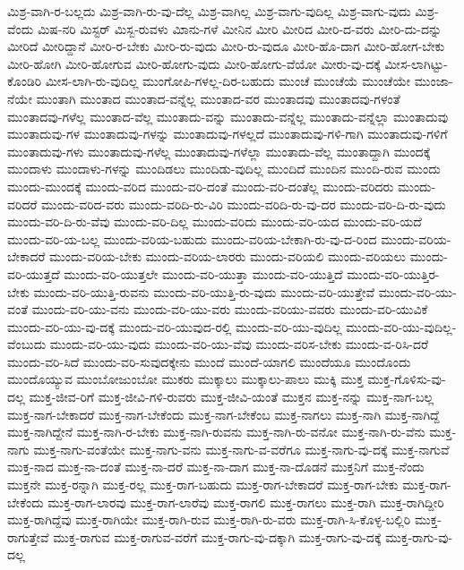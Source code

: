 {ಮಿಶ್ರ-ವಾಗಿ-ರ-ಬಲ್ಲದು
ಮಿಶ್ರ-ವಾಗಿ-ರು-ವು-ದೆಲ್ಲ
ಮಿಶ್ರ-ವಾಗಿಲ್ಲ
ಮಿಶ್ರ-ವಾಗು-ವುದಿಲ್ಲ
ಮಿಶ್ರ-ವಾಗು-ವುದು
ಮಿಶ್ರ-ವೆಂದು
ಮಿಷ-ನರಿ
ಮಿಸ್ಟರ್
ಮಿಸ್ಬ-ರುವಳು
ಮಿಾನು-ಗಳೆ
ಮೀನಿನ
ಮೀರಿ
ಮೀರಿದ
ಮೀರಿ-ದ-ವರು
ಮೀರಿ-ದು-ದನ್ನು
ಮೀರಿದೆ
ಮೀರಿದ್ದಾನೆ
ಮೀರಿ-ರ-ಬೇಕು
ಮೀರಿ-ರು-ವುದು
ಮೀರಿ-ರು-ವುದೂ
ಮೀರಿ-ಹೊ-ದಾಗ
ಮೀರಿ-ಹೋಗ-ಬೇಕು
ಮೀರಿ-ಹೋಗಿ
ಮೀರಿ-ಹೋಗುವ
ಮೀರಿ-ಹೋಗು-ವುದು
ಮೀರಿ-ಹೋಗು-ವೆಯೋ
ಮೀರು-ವು-ದಕ್ಕೆ
ಮೀಸ-ಲಾಗಿಟ್ಟು-ಕೊಂಡಿರಿ
ಮೀಸ-ಲಾಗಿ-ರು-ವುದಿಲ್ಲ
ಮುಂಗೋಪಿ-ಗಳಲ್ಲ-ದಿರ-ಬಹುದು
ಮುಂಚೆ
ಮುಂಚೆಯೆ
ಮುಂಚೆಯೇ
ಮುಂಜಾ-ನೆಯೇ
ಮುಂತಾಗಿ
ಮುಂತಾದ
ಮುಂತಾದ-ವನ್ನೆಲ್ಲ
ಮುಂತಾದ-ವರ
ಮುಂತಾದವು
ಮುಂತಾದವು-ಗಳಂತೆ
ಮುಂತಾದವು-ಗಳೆಲ್ಲ
ಮುಂತಾದ-ವೆಲ್ಲ
ಮುಂತಾದು-ವನ್ನು
ಮುಂತಾದು-ವನ್ನೆಲ್ಲ
ಮುಂತಾದು-ವನ್ನೆಲ್ಲಾ
ಮುಂತಾದುವು
ಮುಂತಾದುವು-ಗಳ
ಮುಂತಾದುವು-ಗಳನ್ನು
ಮುಂತಾದುವು-ಗಳಲ್ಲದೆ
ಮುಂತಾದುವು-ಗಳಿ-ಗಾಗಿ
ಮುಂತಾದುವು-ಗಳಿಗೆ
ಮುಂತಾದುವು-ಗಳು
ಮುಂತಾದುವು-ಗಳೆಲ್ಲ
ಮುಂತಾದುವು-ಗಳೆಲ್ಲಾ
ಮುಂತಾದು-ವೆಲ್ಲ
ಮುಂತಾದ್ದಾಗಿ
ಮುಂದಕ್ಕೆ
ಮುಂದಾಳು
ಮುಂದಾಳು-ಗಳನ್ನು
ಮುಂದಿಡಲು
ಮುಂದಿಡು-ವುದಿಲ್ಲ
ಮುಂದಿದೆ
ಮುಂದಿನ
ಮುಂದಿ-ರುವ
ಮುಂದು
ಮುಂದು-ಮುಂದಕ್ಕೆ
ಮುಂದು-ವರಿದ
ಮುಂದು-ವರಿ-ದಂತೆ
ಮುಂದು-ವರಿ-ದಂತೆಲ್ಲ
ಮುಂದು-ವರಿದರು
ಮುಂದು-ವರಿದರೆ
ಮುಂದು-ವರಿದ-ವರು
ಮುಂದು-ವರಿದಿ-ರು-ವಿರಿ
ಮುಂದು-ವರಿದಿ-ರು-ವು-ದರ
ಮುಂದು-ವರಿ-ದಿ-ರು-ವುದು
ಮುಂದು-ವರಿ-ದಿ-ರು-ವೆವು
ಮುಂದು-ವರಿ-ದಿಲ್ಲ
ಮುಂದು-ವರಿದು
ಮುಂದು-ವರಿ-ಯದ
ಮುಂದು-ವರಿ-ಯದೆ
ಮುಂದು-ವರಿ-ಯ-ಬಲ್ಲ
ಮುಂದು-ವರಿಯ-ಬಹುದು
ಮುಂದು-ವರಿಯ-ಬೇಕಾಗಿ-ರು-ವು-ದ-ರಿಂದ
ಮುಂದು-ವರಿಯ-ಬೇಕಾದರೆ
ಮುಂದು-ವರಿಯ-ಬೇಕು
ಮುಂದು-ವರಿಯ-ಲಾರರು
ಮುಂದು-ವರಿಯಲಿ
ಮುಂದು-ವರಿಯಲು
ಮುಂದು-ವರಿ-ಯುತ್ತದೆ
ಮುಂದು-ವರಿ-ಯುತ್ತಲೇ
ಮುಂದು-ವರಿ-ಯುತ್ತಾ
ಮುಂದು-ವರಿ-ಯುತ್ತಿದೆ
ಮುಂದು-ವರಿ-ಯುತ್ತಿರ-ಬೇಕು
ಮುಂದು-ವರಿ-ಯುತ್ತಿ-ರುವನು
ಮುಂದು-ವರಿ-ಯುತ್ತಿ-ರು-ವುದು
ಮುಂದು-ವರಿ-ಯುತ್ತೇವೆ
ಮುಂದು-ವರಿ-ಯು-ವಂತೆ
ಮುಂದು-ವರಿ-ಯು-ವನು
ಮುಂದು-ವರಿ-ಯು-ವರು
ಮುಂದು-ವರಿಯು-ವವರು
ಮುಂದು-ವರಿ-ಯುವಿಕೆ
ಮುಂದು-ವರಿ-ಯು-ವು-ದಕ್ಕೆ
ಮುಂದು-ವರಿ-ಯುವುದ-ರಲ್ಲಿ
ಮುಂದು-ವರಿ-ಯು-ವುದಿಲ್ಲ
ಮುಂದು-ವರಿ-ಯು-ವುದಿಲ್ಲ-ವೆಂಬುದು
ಮುಂದು-ವರಿ-ಯು-ವುದು
ಮುಂದು-ವರಿ-ಯು-ವೆವು
ಮುಂದು-ವರಿಸ-ಬೇಕು
ಮುಂದು-ವ-ರಿಸಿ-ದರೆ
ಮುಂದು-ವರಿ-ಸಿದೆ
ಮುಂದು-ವರಿ-ಸುವುದಕ್ಕೇನು
ಮುಂದೆ
ಮುಂದೆ-ಯಾಗಲಿ
ಮುಂದೆಯೂ
ಮುಂದೊಂದು
ಮುಂದೊಯ್ಯುವ
ಮುಂಬೋಜುಂಬೋ
ಮುಕರು
ಮುಕ್ಕಾಲು
ಮುಕ್ಕಾಲು-ಪಾಲು
ಮುಕ್ಕಿ
ಮುಕ್ತ
ಮುಕ್ತ-ಗೊಳಿಸು-ವು-ದಲ್ಲ
ಮುಕ್ತ-ಜೀವ-ರಿಗೆ
ಮುಕ್ತ-ಜೀವಿ-ಗಳಿ-ರುವರು
ಮುಕ್ತ-ಜೀವಿ-ಯಂತೆ
ಮುಕ್ತನ
ಮುಕ್ತ-ನನ್ನು
ಮುಕ್ತ-ನಾಗ-ಬಲ್ಲ
ಮುಕ್ತ-ನಾಗ-ಬೇಕಾದರೆ
ಮುಕ್ತ-ನಾಗ-ಬೇಕೆಂದು
ಮುಕ್ತ-ನಾಗ-ಬೇಕೆಂಬ
ಮುಕ್ತ-ನಾಗಲು
ಮುಕ್ತ-ನಾಗಿ
ಮುಕ್ತ-ನಾಗಿದ್ದೆ
ಮುಕ್ತ-ನಾಗಿದ್ದೇನೆ
ಮುಕ್ತ-ನಾಗಿ-ರ-ಬೇಕು
ಮುಕ್ತ-ನಾಗಿ-ರುವನು
ಮುಕ್ತ-ನಾಗಿ-ರು-ವನೋ
ಮುಕ್ತ-ನಾಗಿ-ರು-ವೆನು
ಮುಕ್ತ-ನಾಗು
ಮುಕ್ತ-ನಾಗು-ವಂತೆಯೇ
ಮುಕ್ತ-ನಾಗು-ವನು
ಮುಕ್ತ-ನಾಗು-ವ-ವರೆಗೂ
ಮುಕ್ತ-ನಾಗು-ವು-ದಕ್ಕೆ
ಮುಕ್ತ-ನಾಗುವೆ
ಮುಕ್ತ-ನಾದ
ಮುಕ್ತ-ನಾ-ದಂತೆ
ಮುಕ್ತ-ನಾ-ದರೆ
ಮುಕ್ತ-ನಾ-ದಾಗ
ಮುಕ್ತ-ನಾ-ದೊಡನೆ
ಮುಕ್ತನಿಗೆ
ಮುಕ್ತ-ನೆಂದು
ಮುಕ್ತನೇ
ಮುಕ್ತ-ರನ್ನಾಗಿ
ಮುಕ್ತ-ರಲ್ಲ
ಮುಕ್ತ-ರಾಗ-ಬಹುದು
ಮುಕ್ತ-ರಾಗ-ಬೇಕಾದರೆ
ಮುಕ್ತ-ರಾಗ-ಬೇಕು
ಮುಕ್ತ-ರಾಗ-ಬೇಕೆಂದು
ಮುಕ್ತ-ರಾಗ-ಲಾರವು
ಮುಕ್ತ-ರಾಗ-ಲಾರೆವು
ಮುಕ್ತ-ರಾಗಲಿ
ಮುಕ್ತ-ರಾಗಲು
ಮುಕ್ತ-ರಾಗಿ
ಮುಕ್ತ-ರಾಗಿದ್ದೀರಿ
ಮುಕ್ತ-ರಾಗಿದ್ದೆವು
ಮುಕ್ತ-ರಾಗಿಯೇ
ಮುಕ್ತ-ರಾಗಿ-ರುವ
ಮುಕ್ತ-ರಾಗಿ-ರು-ವರು
ಮುಕ್ತ-ರಾಗಿ-ಸಿ-ಕೊಳ್ಳ-ಬಲ್ಲಿರಿ
ಮುಕ್ತ-ರಾಗುತ್ತೇವೆ
ಮುಕ್ತ-ರಾಗುವ
ಮುಕ್ತ-ರಾಗುವ-ವರೆಗೆ
ಮುಕ್ತ-ರಾಗು-ವು-ದಕ್ಕಾಗಿ
ಮುಕ್ತ-ರಾಗು-ವು-ದಕ್ಕೆ
ಮುಕ್ತ-ರಾಗು-ವು-ದಲ್ಲ
}
